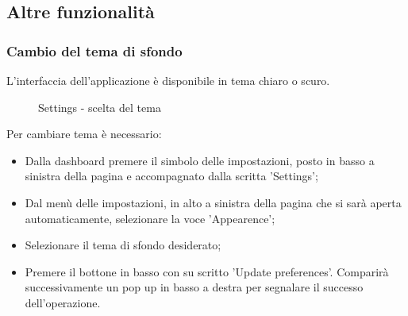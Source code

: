 \documentclass[10pt, a4paper]{article}
\begin{document}
\newpage
\subsection{Altre funzionalità}
\subsubsection{Cambio del tema di sfondo}
L'interfaccia dell'applicazione è disponibile in tema chiaro o scuro.\\
\begin{figure}[H]
    \centering  
    \caption{Settings - scelta del tema}
\end{figure}
 Per cambiare tema è necessario:
\begin{itemize}
    \item Dalla dashboard premere il simbolo delle impostazioni, posto in basso a sinistra della pagina e accompagnato dalla scritta 'Settings';
    \item Dal menù delle impostazioni, in alto a sinistra della pagina che si sarà aperta automaticamente, selezionare la voce 'Appearence';
    \item Selezionare il tema di sfondo desiderato;
    \item Premere il bottone in basso con su scritto 'Update preferences'. Comparirà successivamente un pop up in basso a destra per segnalare il successo dell'operazione.
\end{itemize}
\end{document}
